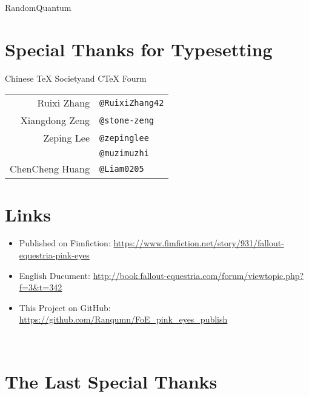 \begin{center}
    RandomQuantum
\end{center}

\section*{Special Thanks for Typesetting}

\begin{table}[H]
    \centering
    
    \begin{center}
    Chinese \TeX{} Society\footnotemark and C\TeX{} Fourm\footnotemark
    \end{center}
  
    \begin{tabular}{rl}
        Ruixi Zhang & \texttt{@RuixiZhang42} \\
        Xiangdong Zeng & \texttt{@stone-zeng} \\
        Zeping Lee & \texttt{@zepinglee} \\
        & \texttt{@muzimuzhi} \\
        ChenCheng Huang & \texttt{@Liam0205} \\
    \end{tabular}
\end{table}

\addtocounter{footnote}{-2} %



\section*{Links}

\begin{itemize}
    \item Published on Fimfiction: \url{https://www.fimfiction.net/story/931/fallout-equestria-pink-eyes}
    \item English Ducument: \url{http://book.fallout-equestria.com/forum/viewtopic.php?f=3\&t=342}
    \item This Project on GitHub: \url{https://github.com/Ranqumn/FoE_pink_eyes_publish}
\end{itemize}


\clearpage


~\vfill

\section*{The Last Special Thanks}

